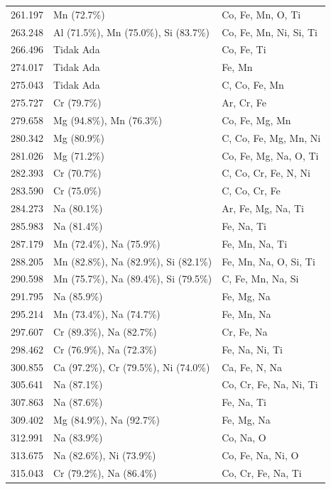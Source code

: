 \begin{onehalfspace}
\begin{longtable}{p{}p{}p{}}
        261.197 & Mn (72.7\%) & Co, Fe, Mn, O, Ti \\
        263.248 & Al (71.5\%), Mn (75.0\%), Si (83.7\%) & Co, Fe, Mn, Ni, Si, Ti \\
        266.496 & Tidak Ada & Co, Fe, Ti \\
        274.017 & Tidak Ada & Fe, Mn \\
        275.043 & Tidak Ada & C, Co, Fe, Mn \\
        275.727 & Cr (79.7\%) & Ar, Cr, Fe \\
        279.658 & Mg (94.8\%), Mn (76.3\%) & Co, Fe, Mg, Mn \\
        280.342 & Mg (80.9\%) & C, Co, Fe, Mg, Mn, Ni \\
        281.026 & Mg (71.2\%) & Co, Fe, Mg, Na, O, Ti \\
        282.393 & Cr (70.7\%) & C, Co, Cr, Fe, N, Ni \\
        283.590 & Cr (75.0\%) & C, Co, Cr, Fe \\
        284.273 & Na (80.1\%) & Ar, Fe, Mg, Na, Ti \\
        285.983 & Na (81.4\%) & Fe, Na, Ti \\
        287.179 & Mn (72.4\%), Na (75.9\%) & Fe, Mn, Na, Ti \\
        288.205 & Mn (82.8\%), Na (82.9\%), Si (82.1\%) & Fe, Mn, Na, O, Si, Ti \\
        290.598 & Mn (75.7\%), Na (89.4\%), Si (79.5\%) & C, Fe, Mn, Na, Si \\
        291.795 & Na (85.9\%) & Fe, Mg, Na \\
        295.214 & Mn (73.4\%), Na (74.7\%) & Fe, Mn, Na \\
        297.607 & Cr (89.3\%), Na (82.7\%) & Cr, Fe, Na \\
        298.462 & Cr (76.9\%), Na (72.3\%) & Fe, Na, Ni, Ti \\
        300.855 & Ca (97.2\%), Cr (79.5\%), Ni (74.0\%) & Ca, Fe, N, Na \\
        305.641 & Na (87.1\%) & Co, Cr, Fe, Na, Ni, Ti \\
        307.863 & Na (87.6\%) & Fe, Na, Ti \\
        309.402 & Mg (84.9\%), Na (92.7\%) & Fe, Mg, Na \\
        312.991 & Na (83.9\%) & Co, Na, O \\
        313.675 & Na (82.6\%), Ni (73.9\%) & Co, Fe, Na, Ni, O \\
        315.043 & Cr (79.2\%), Na (86.4\%) & Co, Cr, Fe, Na, Ti \\

\end{longtable}
\end{onehalfspace}
